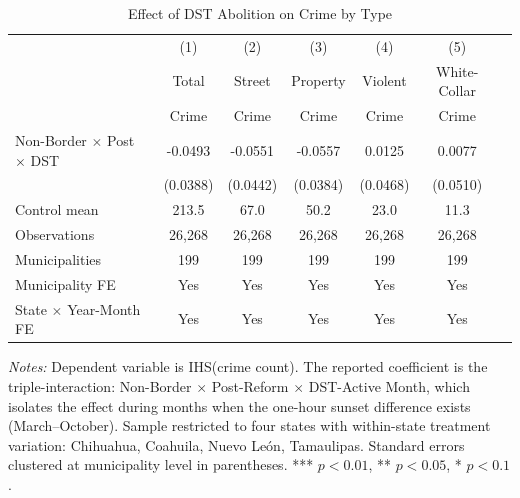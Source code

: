 \begin{table}[htbp]
\centering
\caption{Effect of DST Abolition on Crime by Type}
\label{tab:main}
\begin{threeparttable}
\begin{tabular}{lcccccc}
\toprule
 & (1) & (2) & (3) & (4) & (5) \\
 & Total & Street & Property & Violent & White-Collar \\
 & Crime & Crime & Crime & Crime & Crime \\
\midrule
Non-Border $\times$ Post $\times$ DST & -0.0493 & -0.0551 & -0.0557 & 0.0125 & 0.0077 \\
 & (0.0388) & (0.0442) & (0.0384) & (0.0468) & (0.0510) \\
\midrule
Control mean & 213.5 & 67.0 & 50.2 & 23.0 & 11.3 \\
Observations & 26,268 & 26,268 & 26,268 & 26,268 & 26,268 \\
Municipalities & 199 & 199 & 199 & 199 & 199 \\
Municipality FE & Yes & Yes & Yes & Yes & Yes \\
State $\times$ Year-Month FE & Yes & Yes & Yes & Yes & Yes \\
\bottomrule
\end{tabular}
\begin{tablenotes}[flushleft]\small
\item \textit{Notes:} Dependent variable is IHS(crime count). The reported coefficient is the triple-interaction: Non-Border $\times$ Post-Reform $\times$ DST-Active Month, which isolates the effect during months when the one-hour sunset difference exists (March--October). Sample restricted to four states with within-state treatment variation: Chihuahua, Coahuila, Nuevo Le\'on, Tamaulipas. Standard errors clustered at municipality level in parentheses. *** $p<0.01$, ** $p<0.05$, * $p<0.1$.
\end{tablenotes}
\end{threeparttable}
\end{table}
